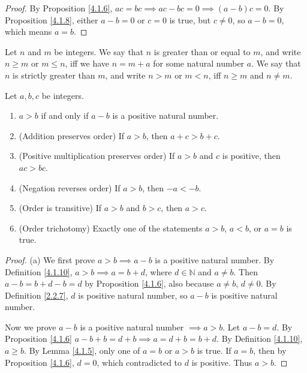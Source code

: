 \begin{proof}
By Proposition \ref{4.1.6}, \(ac = bc \implies ac - bc = 0 \implies (a - b)c = 0\).
By Proposition \ref{4.1.8}, either \(a - b = 0\) or \(c = 0\) is true, but \(c \neq 0\), so \(a - b = 0\), which means \(a = b\).
\end{proof}

\begin{definition}\label{4.1.10}
Let \(n\) and \(m\) be integers.
We say that \(n\) is greater than or equal to \(m\), and write \(n \geq m\) or \(m \leq n\), iff we have \(n = m + a\) for some natural number \(a\).
We say that \(n\) is strictly greater than \(m\), and write \(n > m\) or \(m < n\), iff \(n \geq m\) and \(n \neq m\).
\end{definition}

\begin{lemma}\label{4.1.11}
Let \(a, b, c\) be integers.
\begin{enumerate}
    \item \(a > b\) if and only if \(a - b\) is a positive natural number.
    \item (Addition preserves order) If \(a > b\), then \(a + c > b + c\).
    \item (Positive multiplication preserves order) If \(a > b\) and \(c\) is positive, then \(ac > bc\).
    \item (Negation reverses order) If \(a > b\), then \(-a < -b\).
    \item (Order is transitive) If \(a > b\) and \(b > c\), then \(a > c\).
    \item (Order trichotomy) Exactly one of the statements \(a > b\), \(a < b\), or \(a = b\) is true.
\end{enumerate}
\end{lemma}

\begin{proof}{(a)}
We first prove \(a > b \implies a - b\) is a positive natural number.
By Definition \ref{4.1.10}, \(a > b \implies a = b + d\), where \(d \in \mathds{N}\) and \(a \neq b\).
Then \(a - b = b + d - b = d\) by Proposition \ref{4.1.6}, also because \(a \neq b\), \(d \neq 0\).
By Definition \ref{2.2.7}, \(d\) is positive natural number, so \(a - b\) is positive natural number.

Now we prove \(a - b\) is a positive natural number \(\implies a > b\).
Let \(a - b = d\).
By Proposition \ref{4.1.6} \(a - b + b = d + b \implies a = d + b = b + d\).
By Definition \ref{4.1.10}, \(a \geq b\).
By Lemma \ref{4.1.5}, only one of \(a = b\) or \(a > b\) is true.
If \(a = b\), then by Proposition \ref{4.1.6}, \(d = 0\), which contradicted to \(d\) is positive.
Thus \(a > b\).
\end{proof}

